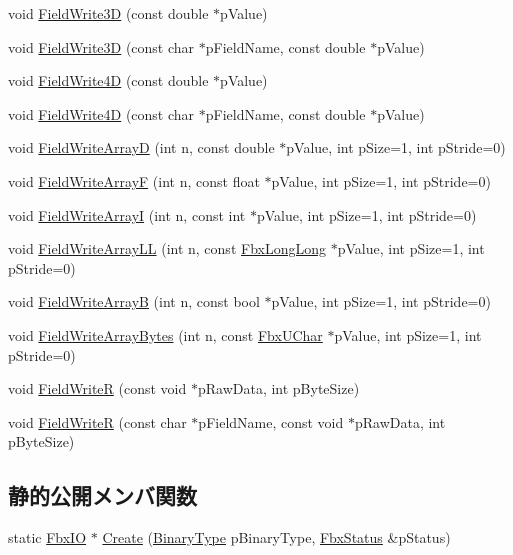 \begin{Indent}
\begin{DoxyCompactItemize}
\item 
void \hyperlink{class_fbx_i_o_a660cf4cc58d7e8d9fd633904fef933b2}{Field\+Write3D} (const double $\ast$p\+Value)
\item 
void \hyperlink{class_fbx_i_o_a14449984a005d7a0dfa4aad0b67c193f}{Field\+Write3D} (const char $\ast$p\+Field\+Name, const double $\ast$p\+Value)
\item 
void \hyperlink{class_fbx_i_o_a1be353021cf6900197d95401d1e12b39}{Field\+Write4D} (const double $\ast$p\+Value)
\item 
void \hyperlink{class_fbx_i_o_a6c8d10011731dd4433a45e3204907d21}{Field\+Write4D} (const char $\ast$p\+Field\+Name, const double $\ast$p\+Value)
\item 
void \hyperlink{class_fbx_i_o_a5885f5a3e98344e8d5c4cddd1be19b1f}{Field\+Write\+ArrayD} (int n, const double $\ast$p\+Value, int p\+Size=1, int p\+Stride=0)
\item 
void \hyperlink{class_fbx_i_o_a319588df278b9858383decf2af4e7933}{Field\+Write\+ArrayF} (int n, const float $\ast$p\+Value, int p\+Size=1, int p\+Stride=0)
\item 
void \hyperlink{class_fbx_i_o_acbbd0e1ee10773d66d6db0a0720d3b96}{Field\+Write\+ArrayI} (int n, const int $\ast$p\+Value, int p\+Size=1, int p\+Stride=0)
\item 
void \hyperlink{class_fbx_i_o_a4fbc5dd718de15ddee5502bbb9715350}{Field\+Write\+Array\+LL} (int n, const \hyperlink{fbxtypes_8h_ac34da60c22b0a7e1156e5480da7d71f1}{Fbx\+Long\+Long} $\ast$p\+Value, int p\+Size=1, int p\+Stride=0)
\item 
void \hyperlink{class_fbx_i_o_abef29a51a9c6fac344540c6502825e30}{Field\+Write\+ArrayB} (int n, const bool $\ast$p\+Value, int p\+Size=1, int p\+Stride=0)
\item 
void \hyperlink{class_fbx_i_o_a06a46a80a8af1f130ad3ba17a85028f0}{Field\+Write\+Array\+Bytes} (int n, const \hyperlink{fbxtypes_8h_a1be3cadf61e76f49142eb83e66ffe8bd}{Fbx\+U\+Char} $\ast$p\+Value, int p\+Size=1, int p\+Stride=0)
\item 
void \hyperlink{class_fbx_i_o_a78bcd5827ec40c7e6ae7fe8efd1a89c3}{Field\+WriteR} (const void $\ast$p\+Raw\+Data, int p\+Byte\+Size)
\item 
void \hyperlink{class_fbx_i_o_aac89d8d19b63493c9fa29400161d42f3}{Field\+WriteR} (const char $\ast$p\+Field\+Name, const void $\ast$p\+Raw\+Data, int p\+Byte\+Size)
\end{DoxyCompactItemize}
\end{Indent}
\subsection*{静的公開メンバ関数}
\begin{DoxyCompactItemize}
\item 
static \hyperlink{class_fbx_i_o}{Fbx\+IO} $\ast$ \hyperlink{class_fbx_i_o_a4f769569a424543d247289687b9b74bd}{Create} (\hyperlink{class_fbx_i_o_ad0532f36367fa6b750993000dfb8ed1e}{Binary\+Type} p\+Binary\+Type, \hyperlink{class_fbx_status}{Fbx\+Status} \&p\+Status)
\end{DoxyCompactItemize}

